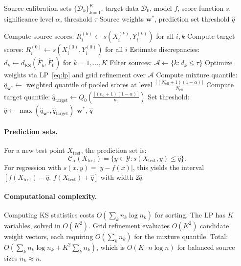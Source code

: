 \documentclass{article}
\newcommand{\calY}{\mathcal{Y}}
\newcommand{\calC}{\mathcal{C}}
\newcommand{\calD}{\mathcal{D}}
\newcommand{\dKS}{d_{\mathrm{KS}}}
\newcommand{\Fhat}{\widehat{F}}
\newcommand{\qhat}{\widehat{q}}
\newcommand{\DISCOM}{\textsc{DISCOM-CP}}
\begin{document}
\begin{algorithm}[t]
\caption{\DISCOM{}: Discrepancy-Guided Multi-Source Conformal Prediction}
\label{alg:discom}
\begin{algorithmic}[1]
\REQUIRE Source calibration sets $\{\calD_k\}_{k=1}^K$, target data $\calD_0$, model $f$, score function $s$, significance level $\alpha$, threshold $\tau$
\ENSURE Source weights $\mathbf{w}^*$, prediction set threshold $\qhat$

\STATE Compute source scores: $R_i^{(k)} \gets s(X_i^{(k)}, Y_i^{(k)})$ for all $i, k$
\STATE Compute target scores: $R_i^{(0)} \gets s(X_i^{(0)}, Y_i^{(0)})$ for all $i$
\STATE Estimate discrepancies: $d_k \gets \dKS(\Fhat_k, \Fhat_0)$ for $k = 1, \ldots, K$
\STATE Filter sources: $\mathcal{A} \gets \{k : d_k \leq \tau\}$
\STATE Optimize weights via LP~\eqref{eq:lp} and grid refinement over $\mathcal{A}$
\STATE Compute mixture quantile: $\qhat_{\mathbf{w}^*} \gets$ weighted quantile of pooled scores at level $\frac{\lceil(N_{\text{eff}}+1)(1-\alpha)\rceil}{N_{\text{eff}}}$
\STATE Compute target quantile: $\qhat_{\text{target}} \gets Q_0\!\left(\frac{\lceil(n_0+1)(1-\alpha)\rceil}{n_0}\right)$
\STATE Set threshold: $\qhat \gets \max(\qhat_{\mathbf{w}^*}, \qhat_{\text{target}})$
\RETURN $\mathbf{w}^*$, $\qhat$
\end{algorithmic}
\end{algorithm}

\paragraph{Prediction sets.} For a new test point $X_{\text{test}}$, the prediction set is:
\begin{equation}
\calC_\alpha(X_{\text{test}}) = \{y \in \calY : s(X_{\text{test}}, y) \leq \qhat\}.
\end{equation}
For regression with $s(x,y) = |y - f(x)|$, this yields the interval $[f(X_{\text{test}}) - \qhat, \, f(X_{\text{test}}) + \qhat]$ with width $2\qhat$.

\paragraph{Computational complexity.}
Computing KS statistics costs $O(\sum_k n_k \log n_k)$ for sorting. The LP has $K$ variables, solved in $O(K^2)$. Grid refinement evaluates $O(K^2)$ candidate weight vectors, each requiring $O(\sum_k n_k)$ for the mixture quantile. Total: $O(\sum_k n_k \log n_k + K^2 \sum_k n_k)$, which is $O(K \cdot n \log n)$ for balanced source sizes $n_k \approx n$.
\end{document}
